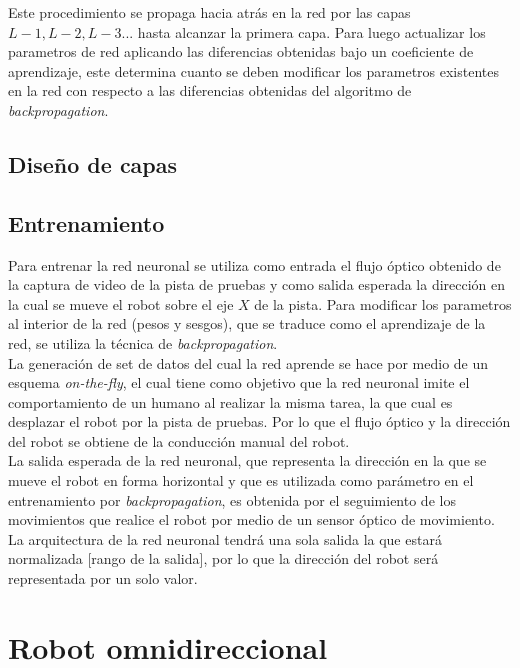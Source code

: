 \documentclass{iccmemoria}
\begin{document}
Este procedimiento se propaga hacia atrás en la red por las capas $L-1, L-2, L-3...$ hasta alcanzar la primera capa. Para luego actualizar los parametros de red aplicando las diferencias obtenidas bajo un coeficiente de aprendizaje, este determina cuanto se deben modificar los parametros existentes en la red con respecto a las diferencias obtenidas del algoritmo de \emph{backpropagation}.

\subsection{Diseño de capas}

\subsection{Entrenamiento}

Para entrenar la red neuronal se utiliza como entrada el flujo óptico obtenido de la captura de video de la pista de pruebas y como salida esperada la dirección en la cual se mueve el robot sobre el eje $X$ de la pista. Para modificar los parametros al interior de la red (pesos y sesgos), que se traduce como el aprendizaje de la red, se utiliza la técnica de \emph{backpropagation}.\\

La generación de set de datos del cual la red aprende se hace por medio de un esquema \emph{on-the-fly}, el cual tiene como objetivo que la red neuronal imite el comportamiento de un humano al realizar la misma tarea, la que cual es desplazar el robot por la pista de pruebas. Por lo que el flujo óptico y la dirección del robot se obtiene de la conducción manual del robot.\\

La salida esperada de la red neuronal, que representa la dirección en la que se mueve el robot en forma horizontal y que es utilizada como parámetro en el entrenamiento por \emph{backpropagation}, es obtenida por el seguimiento de los movimientos que realice el robot por medio de un sensor óptico de movimiento. La arquitectura de la red neuronal tendrá una sola salida la que estará normalizada [rango de la salida], por lo que la dirección del robot será representada por un solo valor.\\

\section{Robot omnidireccional}
\end{document}
